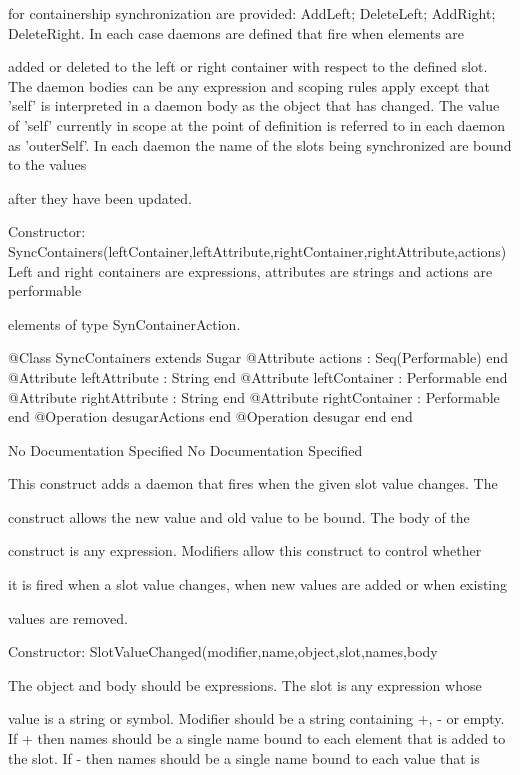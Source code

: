        for containership synchronization are provided: AddLeft; DeleteLeft; AddRight;
       DeleteRight. In each case daemons are defined that fire when elements are

       added or deleted to the left or right container with respect to the defined slot.
       The daemon bodies can be any expression and scoping rules apply except that 'self'
       is interpreted in a daemon body as the object that has changed. The value of 'self'
       currently in scope at the point of definition is referred to in each daemon as 'outerSelf'.
       In each daemon the name of the slots being synchronized are bound to the values

       after they have been updated.
       
       Constructor: SyncContainers(leftContainer,leftAttribute,rightContainer,rightAttribute,actions)
         Left and right containers are expressions, attributes are strings and actions are performable

         elements of type SynContainerAction.
\begin{Interface}
@Class SyncContainers extends Sugar
  @Attribute actions : Seq(Performable) end
  @Attribute leftAttribute : String end
  @Attribute leftContainer : Performable end
  @Attribute rightAttribute : String end
  @Attribute rightContainer : Performable end
  @Operation desugarActions end
  @Operation desugar end
end
\end{Interface}
No Documentation Specified
No Documentation Specified

      This construct adds a daemon that fires when the given slot value changes. The

      construct allows the new value and old value to be bound. The body of the

      construct is any expression. Modifiers allow this construct to control whether

      it is fired when a slot value changes, when new values are added or when existing

      values are removed.
      
      Constructor: SlotValueChanged(modifier,name,object,slot,names,body

        The object and body should be expressions. The slot is any expression whose

        value is a string or symbol. Modifier should be a string containing +, - or empty.
        If + then names should be a single name bound to each element that is added 
        to the slot. If - then names should be a single name bound to each value that is

